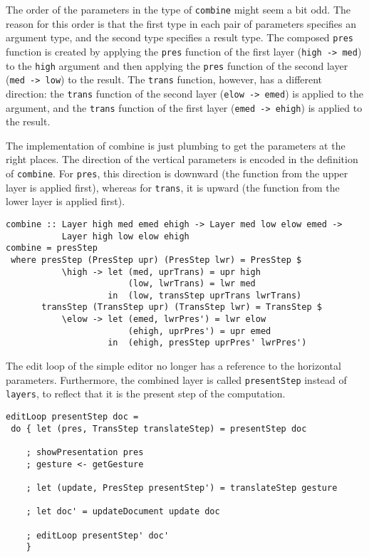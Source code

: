 \par The order of the parameters in the type of \texttt{combine} might seem a
      bit odd. The reason for this order is that the first type in each pair of
      parameters specifies an argument type, and the second type specifies a result
      type. The composed \texttt{pres} function is created by applying the
      \texttt{pres} function of the first layer (\texttt{high -> med}) to the
      \texttt{high} argument and then applying the \texttt{pres} function of the
      second layer (\texttt{med -> low}) to the result. The \texttt{trans}
      function, however, has a different direction: the \texttt{trans} function of
      the second layer (\texttt{elow -> emed}) is applied to the argument, and the
      \texttt{trans} function of the first layer (\texttt{emed -> ehigh}) is
      applied to the result.
\par The implementation of combine is just plumbing to get the parameters at
      the right places. The direction of the vertical parameters is encoded in the
      definition of \texttt{combine}. For \texttt{pres}, this direction is downward
      (the function from the upper layer is applied first), whereas for
      \texttt{trans}, it is upward (the function from the lower layer is applied
      first).\begin{small}\begin{verbatim}combine :: Layer high med emed ehigh -> Layer med low elow emed -> 
           Layer high low elow ehigh
combine = presStep
 where presStep (PresStep upr) (PresStep lwr) = PresStep $ 
           \high -> let (med, uprTrans) = upr high
                        (low, lwrTrans) = lwr med
                    in  (low, transStep uprTrans lwrTrans)
       transStep (TransStep upr) (TransStep lwr) = TransStep $
           \elow -> let (emed, lwrPres') = lwr elow
                        (ehigh, uprPres') = upr emed
                    in  (ehigh, presStep uprPres' lwrPres') \end{verbatim}\end{small}

\par {}The edit loop of the simple
      editor no longer has a reference to the horizontal parameters. Furthermore, the
      combined layer is called \texttt{presentStep} instead of \texttt{layers}, to
      reflect that it is the present step of the computation.\begin{small}\begin{verbatim}editLoop presentStep doc = 
 do { let (pres, TransStep translateStep) = presentStep doc

    ; showPresentation pres
    ; gesture <- getGesture
    
    ; let (update, PresStep presentStep') = translateStep gesture
    
    ; let doc' = updateDocument update doc
    
    ; editLoop presentStep' doc'
    }\end{verbatim}\end{small}

